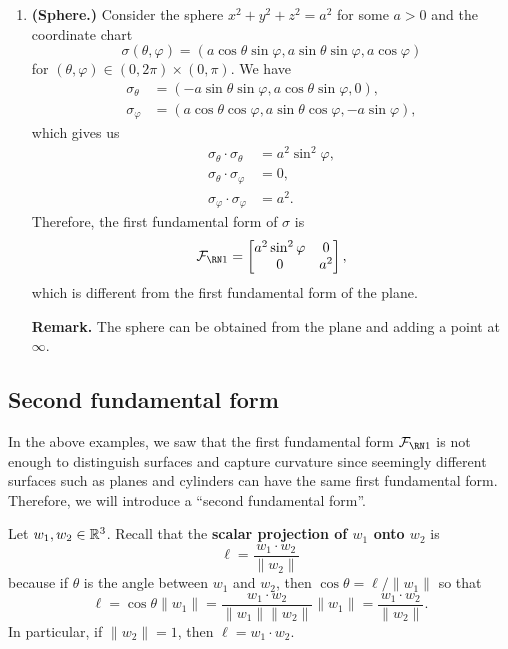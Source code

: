 \begin{enumerate}[(1)]
    \item {\bf (Sphere.)} Consider the sphere $x^2 + y^2 + z^2 = a^2$ 
    for some $a > 0$ and the coordinate chart 
    \[ \sigma(\theta, \varphi) = (a\cos\theta\sin\varphi, a\sin\theta\sin\varphi, a\cos\varphi) \] 
    for $(\theta, \varphi) \in (0, 2\pi) \times (0, \pi)$. We have 
    \begin{align*}
        \sigma_\theta &= (-a\sin\theta\sin\varphi, a\cos\theta\sin\varphi, 0), \\ 
        \sigma_\varphi &= (a\cos\theta\cos\varphi, a\sin\theta\cos\varphi, -a\sin\varphi),
    \end{align*}
    which gives us 
    \begin{align*}
        \sigma_\theta \cdot \sigma_\theta &= a^2\sin^2\varphi, \\ 
        \sigma_\theta \cdot \sigma_\varphi &= 0, \\ 
        \sigma_\varphi \cdot \sigma_\varphi &= a^2.
    \end{align*}
    Therefore, the first fundamental form of $\sigma$ is 
    \[ \FFF = \begin{bmatrix}
        a^2\sin^2\varphi & 0 \\ 0 & a^2
    \end{bmatrix}, \] 
    which is different from the first fundamental form of the plane. 

    {\bf Remark.} The sphere can be obtained from the plane and adding a 
    point at $\infty$. 
\end{enumerate}

\subsection{Second fundamental form} \label{subsec:3.2}
In the above examples, we saw that the first fundamental form $\FFF$ 
is not enough to distinguish surfaces and capture curvature since 
seemingly different surfaces such as planes and cylinders can 
have the same first fundamental form. Therefore, we will introduce a 
``second fundamental form''.

Let $w_1, w_2 \in \mathbb{R}^3$. Recall that the {\bf scalar projection of 
$w_1$ onto $w_2$} is 
\[ \ell = \frac{w_1 \cdot w_2}{\|w_2\|} \] 
because if $\theta$ is the angle between $w_1$ and $w_2$, then 
$\cos\theta = \ell/\|w_1\|$ so that 
\[ \ell = \cos\theta \|w_1\| = \frac{w_1 \cdot w_2}{\|w_1\|\|w_2\|}\|w_1\| 
= \frac{w_1 \cdot w_2}{\|w_2\|}. \] 
In particular, if $\|w_2\| = 1$, then $\ell = w_1 \cdot w_2$. 

